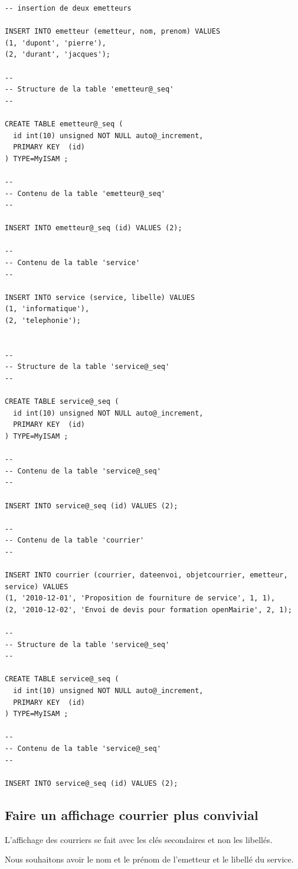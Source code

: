 \documentclass[letterpaper,10pt,french]{manual}
\begin{document}
\begin{Verbatim}[commandchars=@\[\]]
-- insertion de deux emetteurs

INSERT INTO emetteur (emetteur, nom, prenom) VALUES
(1, 'dupont', 'pierre'),
(2, 'durant', 'jacques');

--
-- Structure de la table 'emetteur@_seq'
--

CREATE TABLE emetteur@_seq (
  id int(10) unsigned NOT NULL auto@_increment,
  PRIMARY KEY  (id)
) TYPE=MyISAM ;

--
-- Contenu de la table 'emetteur@_seq'
--

INSERT INTO emetteur@_seq (id) VALUES (2);

--
-- Contenu de la table 'service'
--

INSERT INTO service (service, libelle) VALUES
(1, 'informatique'),
(2, 'telephonie');


--
-- Structure de la table 'service@_seq'
--

CREATE TABLE service@_seq (
  id int(10) unsigned NOT NULL auto@_increment,
  PRIMARY KEY  (id)
) TYPE=MyISAM ;

--
-- Contenu de la table 'service@_seq'
--

INSERT INTO service@_seq (id) VALUES (2);

--
-- Contenu de la table 'courrier'
--

INSERT INTO courrier (courrier, dateenvoi, objetcourrier, emetteur, service) VALUES
(1, '2010-12-01', 'Proposition de fourniture de service', 1, 1),
(2, '2010-12-02', 'Envoi de devis pour formation openMairie', 2, 1);

--
-- Structure de la table 'service@_seq'
--

CREATE TABLE service@_seq (
  id int(10) unsigned NOT NULL auto@_increment,
  PRIMARY KEY  (id)
) TYPE=MyISAM ;

--
-- Contenu de la table 'service@_seq'
--

INSERT INTO service@_seq (id) VALUES (2);
\end{Verbatim}


\subsection{Faire un affichage courrier plus convivial}

L'affichage des courriers se fait avec les clés secondaires et non
les libellés.

Nous souhaitons avoir le nom et le prénom de l'emetteur et le libellé du service.
\end{document}
